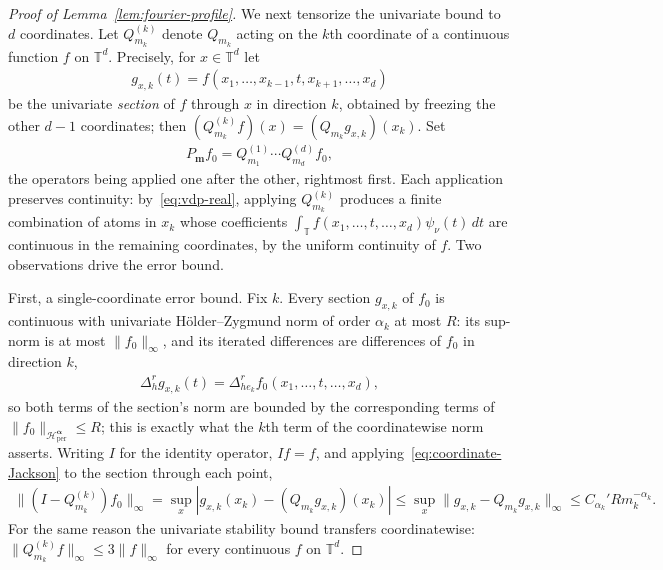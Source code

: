 \begin{proof}[Proof of Lemma~\ref{lem:fourier-profile}]
We next tensorize the univariate bound to $d$ coordinates. Let $Q_{m_k}^{(k)}$ denote $Q_{m_k}$ acting on the $k$th coordinate of a continuous function $f$ on $\mathbb T^d$. Precisely, for $x\in\mathbb T^d$ let
\begin{align*}
g_{x,k}(t)=f(x_1,\ldots,x_{k-1},t,x_{k+1},\ldots,x_d)
\end{align*}
be the univariate \emph{section} of $f$ through $x$ in direction $k$, obtained by freezing the other $d-1$ coordinates; then $(Q_{m_k}^{(k)}f)(x)=(Q_{m_k}g_{x,k})(x_k)$. Set
\begin{align*}
P_{\boldsymbol m}f_0
=Q_{m_1}^{(1)}\cdots Q_{m_d}^{(d)}f_0,
\end{align*}
the operators being applied one after the other, rightmost first. Each application preserves continuity: by~\eqref{eq:vdp-real}, applying $Q_{m_k}^{(k)}$ produces a finite combination of atoms in $x_k$ whose coefficients $\int_{\mathbb T}f(x_1,\ldots,t,\ldots,x_d)\psi_\nu(t)\,dt$ are continuous in the remaining coordinates, by the uniform continuity of $f$. Two observations drive the error bound.

First, a single-coordinate error bound. Fix $k$. Every section $g_{x,k}$ of $f_0$ is continuous with univariate H\"older--Zygmund norm of order $\alpha_k$ at most $R$: its sup-norm is at most $\|f_0\|_\infty$, and its iterated differences are differences of $f_0$ in direction $k$,
\begin{align*}
\Delta_h^{r}g_{x,k}(t)
=\Delta_{he_k}^{r}f_0(x_1,\ldots,t,\ldots,x_d),
\end{align*}
so both terms of the section's norm are bounded by the corresponding terms of $\|f_0\|_{\mathcal H_{\mathrm{per}}^{\boldsymbol\alpha}}\leq R$; this is exactly what the $k$th term of the coordinatewise norm asserts. Writing $I$ for the identity operator, $If=f$, and applying~\eqref{eq:coordinate-Jackson} to the section through each point,
\begin{align*}
\|(I-Q_{m_k}^{(k)})f_0\|_\infty
=\sup_x\left|g_{x,k}(x_k)-(Q_{m_k}g_{x,k})(x_k)\right|
\leq\sup_x\|g_{x,k}-Q_{m_k}g_{x,k}\|_\infty
\leq C_{\alpha_k}'Rm_k^{-\alpha_k}.
\end{align*}
For the same reason the univariate stability bound transfers coordinatewise: $\|Q_{m_k}^{(k)}f\|_\infty\leq3\|f\|_\infty$ for every continuous $f$ on $\mathbb T^d$.


\end{proof}
